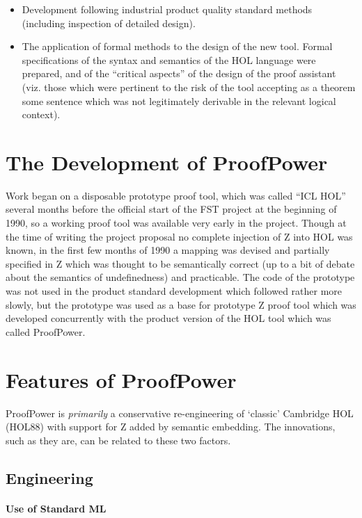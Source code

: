 \documentclass[10pt,titlepage]{book}
\def\Product{ProofPower}
\begin{document}
\begin{itemize}
\item Development following industrial product quality standard methods (including inspection of detailed design).
\item The application of formal methods to the design of the new tool.
Formal specifications of the syntax and semantics of the HOL language were prepared, and of the ``critical aspects'' of the design of the proof assistant (viz. those which were pertinent to the risk of the tool accepting as a theorem some sentence which was not legitimately derivable in the relevant logical context).
\end{itemize}

\section{The Development of ProofPower}

Work began on a disposable prototype proof tool, which was called ``ICL HOL'' several months before the official start of the FST project at the beginning of 1990, so a working proof tool was available very early in the project.
Though at the time of writing the project proposal no complete injection of Z into HOL was known, in the first few months of 1990 a mapping was devised and partially specified in Z which was thought to be semantically correct (up to a bit of debate about the semantics of undefinedness) and practicable.
The code of the prototype was not used in the product standard development which followed rather more slowly, but the prototype was used as a base for prototype Z proof tool which was developed concurrently with the product version of the HOL tool which was called {\Product}.



\section{Features of ProofPower}

{\Product} is {\it primarily} a conservative re-engineering of `classic' Cambridge HOL (HOL88) with support for Z added by semantic embedding.
The innovations, such as they are, can be related to these two factors.

\subsection{Engineering}

\paragraph{Use of Standard ML}
\end{document}

